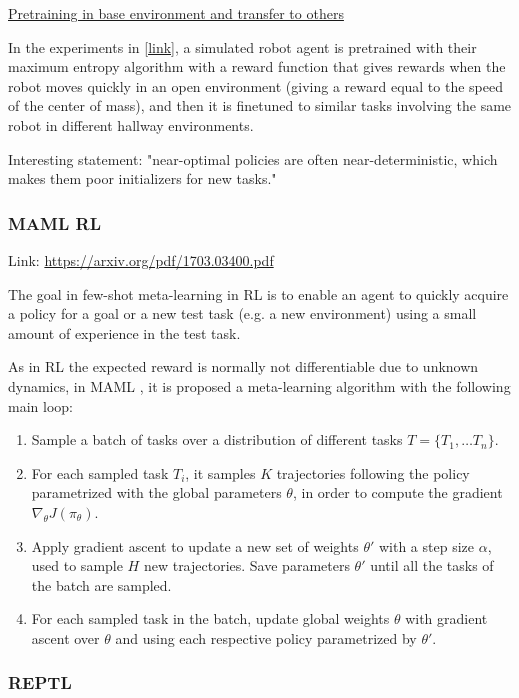 \documentclass[12pt, english]{article}
\begin{document}
\underline{Pretraining in base environment and transfer to others}

In the experiments in \cite{haarnoja_reinforcement_2017} \href{https://arxiv.org/pdf/1702.08165.pdf}{[link]}, a simulated robot agent is pretrained with their maximum entropy algorithm with a reward function that gives rewards when the robot moves quickly in an open environment (giving a reward equal to the speed of the center of mass), and then it is finetuned to similar tasks involving the same robot in different hallway environments.

Interesting statement: "near-optimal policies are often near-deterministic, which makes them poor initializers for new tasks."


\subsubsection{MAML RL}

Link: \url{https://arxiv.org/pdf/1703.03400.pdf}

The goal in few-shot meta-learning in RL is to enable an agent to quickly acquire a policy for a goal or a new test task (e.g. a new environment) using a small amount of experience in the test task.

As in RL the expected reward is normally not differentiable due to unknown dynamics, in MAML \cite{finn_model-agnostic_2017}, it is proposed a meta-learning algorithm with the following main loop:

\begin{enumerate}
  \item Sample a batch of tasks over a distribution of different tasks $T = \{T_1, \dots T_n\}$.
  \item For each sampled task $T_i$, it samples $K$ trajectories following the policy parametrized with the global parameters $\theta$, in order to compute the gradient $\nabla_\theta J(\pi_\theta)$.
  \item Apply gradient ascent to update a new set of weights $\theta'$ with a step size $\alpha$, used to sample $H$ new trajectories. Save parameters $\theta'$ until all the tasks of the batch are sampled.
  \item For each sampled task in the batch, update global weights $\theta$ with gradient ascent over $\theta$ and using each respective policy parametrized by $\theta'$.
\end{enumerate}


\subsubsection{REPTL}
\end{document}
